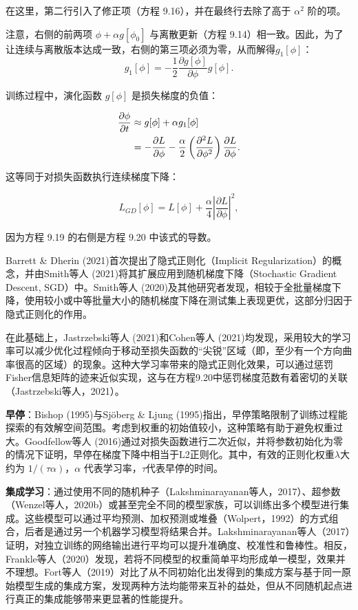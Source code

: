\documentclass[lang=cn,newtx,10pt,scheme=chinese]{elegantbook}
\begin{document}
在这里，第二行引入了修正项（方程 9.16），并在最终行去除了高于 \(\alpha^2\) 阶的项。

注意，右侧的前两项 \(\phi + \alpha g[\phi_0]\) 与离散更新（方程 9.14）相一致。因此，为了让连续与离散版本达成一致，右侧的第三项必须为零，从而解得\(g_1[\phi]\)：
\begin{equation}
g_1[\phi] = - \frac{1}{2} \frac{\partial g[\phi]}{\partial \phi} g[\phi]. 
\end{equation}

训练过程中，演化函数 \(g[\phi]\) 是损失梯度的负值：


\begin{align}
	\frac{\partial \phi}{\partial t} &\approx g[\phi] + \alpha g_1[\phi] \notag \\
	&= -\frac{\partial L}{\partial \phi} - \frac{\alpha}{2} \left( \frac{\partial^2 L}{\partial \phi^2} \right) \frac{\partial L}{\partial \phi}. 
\end{align} 


这等同于对损失函数执行连续梯度下降：

\begin{equation}
L_{GD}[\phi] = L[\phi] + \frac{\alpha}{4} \left| \frac{\partial L}{\partial \phi} \right|^2 , 
\end{equation}

因为方程 9.19 的右侧是方程 9.20 中该式的导数。

Barrett \& Dherin (2021)首次提出了隐式正则化（Implicit Regularization）的概念，并由Smith等人 (2021)将其扩展应用到随机梯度下降（Stochastic Gradient Descent, SGD）中。Smith等人 (2020)及其他研究者发现，相较于全批量梯度下降，使用较小或中等批量大小的随机梯度下降在测试集上表现更优，这部分归因于隐式正则化的作用。

在此基础上，Jastrzebski等人 (2021)和Cohen等人 (2021)均发现，采用较大的学习率可以减少优化过程倾向于移动至损失函数的“尖锐”区域（即，至少有一个方向曲率很高的区域）的现象。这种大学习率带来的隐式正则化效果，可以通过惩罚Fisher信息矩阵的迹来近似实现，这与在方程9.20中惩罚梯度范数有着密切的关联（Jastrzebski等人，2021）。

\textbf{早停}：Bishop (1995)与Sjöberg \& Ljung (1995)指出，早停策略限制了训练过程能探索的有效解空间范围。考虑到权重的初始值较小，这种策略有助于避免权重过大。Goodfellow等人 (2016)通过对损失函数进行二次近似，并将参数初始化为零的情况下证明，早停在梯度下降中相当于L2正则化。其中，有效的正则化权重\(\lambda\)大约为 \(1/(\tau\alpha)\)，\(\alpha\) 代表学习率，\(\tau\)代表早停的时间。

\textbf{集成学习}：通过使用不同的随机种子（Lakshminarayanan等人，2017）、超参数（Wenzel等人，2020b）或甚至完全不同的模型家族，可以训练出多个模型进行集成。这些模型可以通过平均预测、加权预测或堆叠（Wolpert，1992）的方式组合，后者是通过另一个机器学习模型将结果合并。Lakshminarayanan等人（2017）证明，对独立训练的网络输出进行平均可以提升准确度、校准性和鲁棒性。相反，Frankle等人（2020）发现，若将不同模型的权重简单平均形成单一模型，效果并不理想。Fort等人（2019）对比了从不同初始化出发得到的集成方案与基于同一原始模型生成的集成方案，发现两种方法均能带来互补的益处，但从不同随机起点进行真正的集成能够带来更显著的性能提升。
\end{document}
